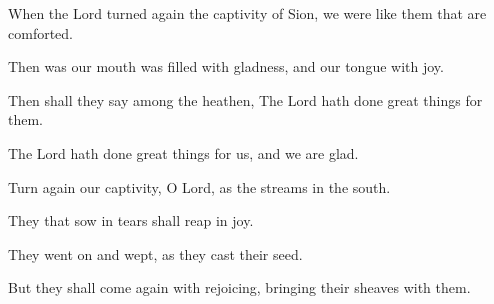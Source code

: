 When the Lord turned again the captivity of Sion, we were like them that are comforted.

Then was our mouth was filled with gladness, and our tongue with joy.

Then shall they say among the heathen, The Lord hath done great things for them.

The Lord hath done great things for us, and we are glad.

Turn again our captivity, O Lord, as the streams in the south.

They that sow in tears shall reap in joy.

They went on and wept, as they cast their seed.

But they shall come again with rejoicing, bringing their sheaves with them.
